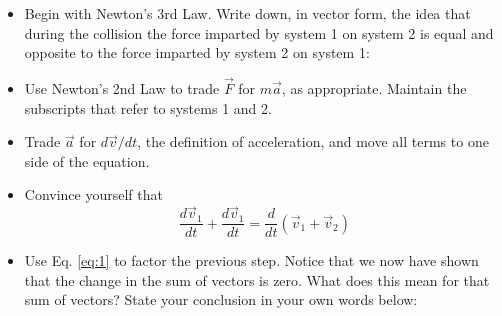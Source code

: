 \documentclass{article}
\begin{document}
\begin{itemize}
\item Begin with Newton's 3rd Law.  Write down, in vector form, the idea that during the collision the force imparted by system 1 on system 2 is equal and opposite to the force imparted by system 2 on system 1: \\ \vspace{0.5cm}
\item Use Newton's 2nd Law to trade $\vec{F}$ for $m\vec{a}$, as appropriate.  Maintain the subscripts that refer to systems 1 and 2. \\ \vspace{0.5cm}
\item Trade $\vec{a}$ for $d\vec{v}/dt$, the definition of acceleration, and move all terms to one side of the equation. \\ \vspace{0.5cm}
\item Convince yourself that
\begin{equation}
\frac{d\vec{v}_1}{dt} + \frac{d\vec{v}_1}{dt} = \frac{d}{dt}\left(\vec{v}_1 + \vec{v}_2\right)\label{eq:1}
\end{equation}
\item Use Eq. \ref{eq:1} to factor the previous step.  Notice that we now have shown that the change in the sum of vectors is zero.  What does this mean for that sum of vectors?  State your conclusion in your own words below:
\end{itemize}
\end{document}
